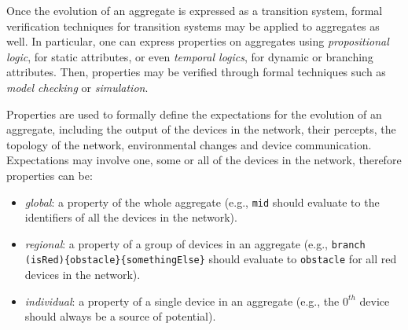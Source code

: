 Once the evolution of an aggregate is expressed as a transition system, formal
verification techniques for transition systems may be applied to aggregates as
well. In particular, one can express properties on aggregates using
\textit{propositional logic}, for static attributes, or even \textit{temporal
logics}, for dynamic or branching attributes. Then, properties may be verified
through formal techniques such as \textit{model checking} or
\textit{simulation}.

Properties are used to formally define the expectations for the evolution of an
aggregate, including the output of the devices in the network, their percepts,
the topology of the network, environmental changes and device communication.
Expectations may involve one, some or all of the devices in the network,
therefore properties can be:
\begin{itemize}
  \item \textit{global}: a property of the whole aggregate (e.g., \texttt{mid}
        should evaluate to the identifiers of all the devices in the network).
  \item \textit{regional}: a property of a group of devices in an aggregate
        (e.g., \texttt{branch (isRed)\{obstacle\}\{somethingElse\}} should
        evaluate to \texttt{obstacle} for all red devices in the network).
  \item \textit{individual}: a property of a single device in an aggregate
        (e.g., the $0^{th}$ device should always be a source of potential).
\end{itemize}
